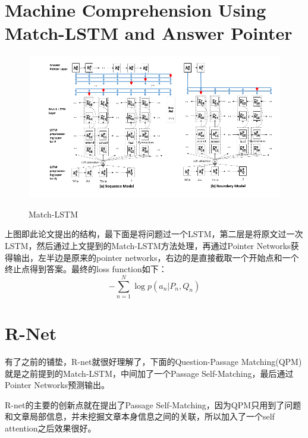 \documentclass[UTF8]{article}
\begin{document}
\section{Machine Comprehension Using Match-LSTM and Answer Pointer}
\begin{figure}[htpb]
    \centering
    \includegraphics[width=0.8\linewidth]{m-p.png}
    \label{fig:Match-LSTM}
    \caption{Match-LSTM}
\end{figure}
上图即此论文提出的结构，最下面是将问题过一个LSTM，第二层是将原文过一次LSTM，然后通过上文提到的Match-LSTM方法处理，再通过Pointer Networks获得输出，左半边是原来的pointer networks，右边的是直接截取一个开始点和一个终止点得到答案。最终的loss function如下：
$$-\sum_{n=1}^N\log p(a_n|P_n,Q_n)$$
\section{R-Net}
\par
有了之前的铺垫，R-net就很好理解了，下面的Question-Passage Matching(QPM)就是之前提到的Match-LSTM，中间加了一个Passage Self-Matching，最后通过Pointer Networks预测输出。
\par
R-net的主要的创新点就在提出了Passage Self-Matching，因为QPM只用到了问题和文章局部信息，并未挖掘文章本身信息之间的关联，所以加入了一个self attention之后效果很好。
\end{document}
